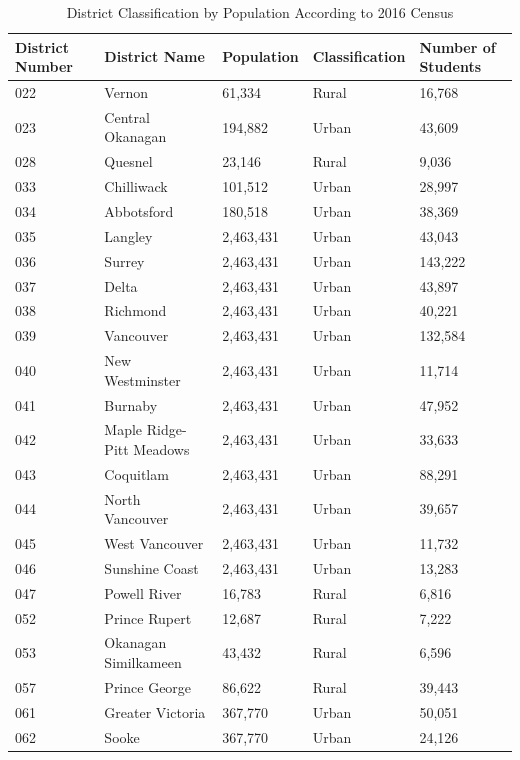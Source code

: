 \documentclass[
  english,
  man,floatsintext]{apa6}
\begin{document}
\begin{table}[tbp]

\begin{center}
\begin{threeparttable}

\caption{\label{tab:District Census Population Table}District Classification by Population According to 2016 Census}

\begin{tabular}{lllll}
\toprule
District Number & District Name & Population & Classification & Number of Students\\
\midrule
022 & Vernon & 61,334 & Rural & 16,768\\
023 & Central Okanagan & 194,882 & Urban & 43,609\\
028 & Quesnel & 23,146 & Rural & 9,036\\
033 & Chilliwack & 101,512 & Urban & 28,997\\
034 & Abbotsford & 180,518 & Urban & 38,369\\
035 & Langley & 2,463,431 & Urban & 43,043\\
036 & Surrey & 2,463,431 & Urban & 143,222\\
037 & Delta & 2,463,431 & Urban & 43,897\\
038 & Richmond & 2,463,431 & Urban & 40,221\\
039 & Vancouver & 2,463,431 & Urban & 132,584\\
040 & New Westminster & 2,463,431 & Urban & 11,714\\
041 & Burnaby & 2,463,431 & Urban & 47,952\\
042 & Maple Ridge-Pitt Meadows & 2,463,431 & Urban & 33,633\\
043 & Coquitlam & 2,463,431 & Urban & 88,291\\
044 & North Vancouver & 2,463,431 & Urban & 39,657\\
045 & West Vancouver & 2,463,431 & Urban & 11,732\\
046 & Sunshine Coast & 2,463,431 & Urban & 13,283\\
047 & Powell River & 16,783 & Rural & 6,816\\
052 & Prince Rupert & 12,687 & Rural & 7,222\\
053 & Okanagan Similkameen & 43,432 & Rural & 6,596\\
057 & Prince George & 86,622 & Rural & 39,443\\
061 & Greater Victoria & 367,770 & Urban & 50,051\\
062 & Sooke & 367,770 & Urban & 24,126\\

\end{tabular}
\end{threeparttable}
\end{center}
\end{table}
\end{document}

